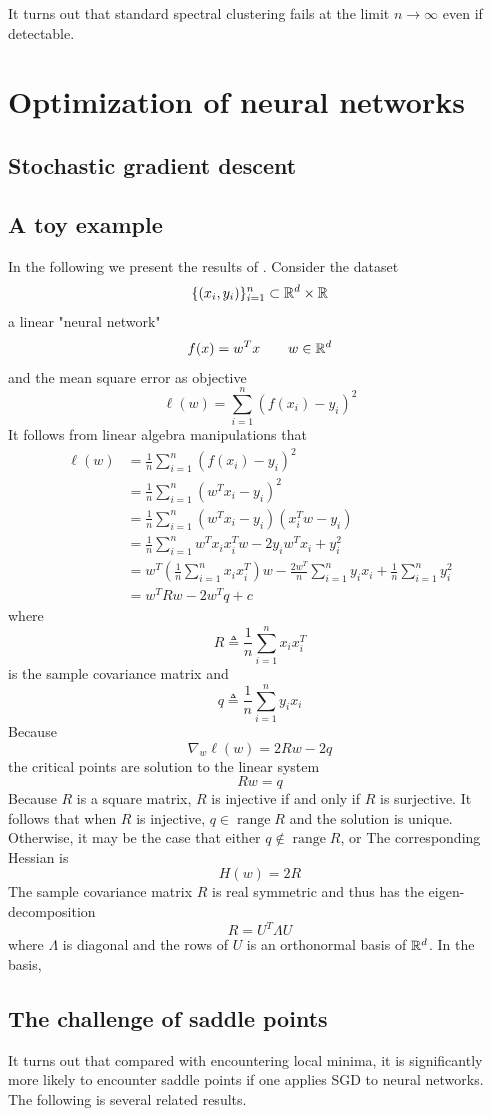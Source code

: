 \documentclass{article}
\DeclareMathOperator{\range}{range}
\begin{document}
It turns out that standard spectral clustering fails at the limit $n \rightarrow \infty$ even if detectable.

\section{Optimization of neural networks}

\subsection{Stochastic gradient descent}

\subsection{A toy example}

In the following we present the results of \cite{le1991eigenvalues}.
Consider the dataset
\[
\{(x_i, y_i)\}_{i = 1}^n \subset {\mathbb R}^d \times {\mathbb R}
\]
a linear "neural network"
\[
f(x) = w^T x \qquad w \in {\mathbb R}^{d}
\]
and the mean square error as objective
\[
\ell (w) = \sum_{i = 1}^n (f(x_i) - y_i)^2
\]
It follows from linear algebra manipulations that
\begin{align*}
\ell (w)
& = \frac1n \sum_{i = 1}^n (f(x_i) - y_i)^2 \\
& = \frac1n \sum_{i = 1}^n (w^T x_i - y_i)^2 \\
& = \frac1n \sum_{i = 1}^n (w^T x_i - y_i) (x_i^T w - y_i) \\
& = \frac1n \sum_{i = 1}^n w^T x_i x_i^T w - 2 y_i w^T x_i + y_i^2 \\
& = w^T \left(\frac1n \sum_{i = 1}^n x_i x_i^T\right) w - \frac{2 w^T}n \sum_{i = 1}^n y_i x_i + \frac1n \sum_{i = 1}^n y_i^2 \\
& = w^T R w - 2 w^T q + c
\end{align*}
where
\[
R \triangleq \frac1n \sum_{i = 1}^n x_i x_i^T
\]
is the sample covariance matrix and
\[
q \triangleq \frac1n \sum_{i = 1}^n y_i x_i
\]
Because
\[
\nabla_w \ell (w) = 2 R w - 2 q
\]
the critical points are solution to the linear system
\[
R w = q
\]
Because $R$ is a square matrix, $R$ is injective if and only if $R$ is surjective.
It follows that when $R$ is injective, $q \in \range R$ and the solution is unique.
Otherwise, it may be the case that either $q \not \in \range R$, or
The corresponding Hessian is
\[
H (w) = 2 R
\]
The sample covariance matrix $R$ is real symmetric and thus has the eigen-decomposition
\[
R = U^T \Lambda U
\]
where $\Lambda$ is diagonal and the rows of $U$ is an orthonormal basis of ${\mathbb R}^d$.
In the basis, 

\subsection{The challenge of saddle points}

It turns out that compared with encountering local minima, it is significantly more likely to encounter saddle points if one applies SGD to neural networks.
The following is several related results.



\end{document}
